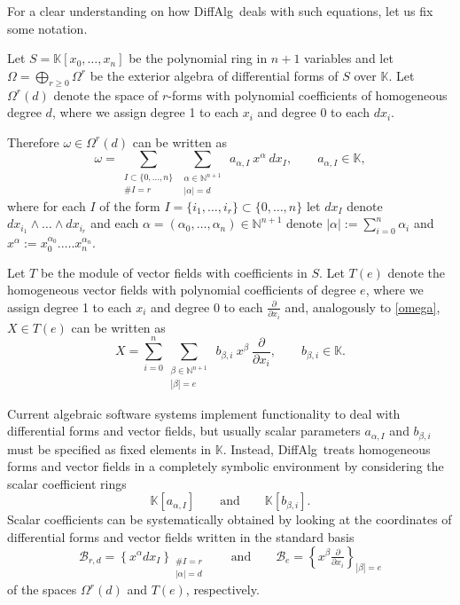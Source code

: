 \documentclass{amsart}
\theoremstyle{definition}
\def\KK{\mathbb{K}}
\def\NN{\mathbb{N}}
\def\dA{{\ttfamily DiffAlg}}
\begin{document}
\bigskip

For a clear understanding on how \dA\ deals with such equations, let us fix some notation.

\bigskip

Let $S=\KK[x_0,\ldots,x_n]$ be the polynomial ring in $n+1$ variables and let $\Omega=\bigoplus_{r\geq 0} \Omega^r$ be the exterior algebra of differential forms of $S$ over $\KK$. Let $\Omega^r(d)$ denote the space of $r$-forms with polynomial coefficients of homogeneous degree $d$, where we assign degree 1 to each $x_i$ and degree 0 to each $dx_i$.

Therefore $\omega\in\Omega^r(d)$ can be written as
\begin{equation}\label{omega}
\omega = \sum_{\substack{I\subset \{0,\ldots,n\} \\ \#I=r}} \sum_{\substack{\alpha\in\NN^{n+1}\\ |\alpha|=d}} \ a_{\alpha,I}\ x^\alpha \ dx_I,\qquad a_{\alpha,I}\in\KK,
\end{equation}
where for each $I$ of the form $I=\{i_1,\ldots,i_r\}\subset \{0,\ldots,n\}$ let $dx_I$ denote $dx_{i_1}\wedge\ldots\wedge dx_{i_r}$ and each $\alpha=(\alpha_0,\ldots,\alpha_n)\in\NN^{n+1}$ denote $|\alpha|:=\sum_{i=0}^n\alpha_i$ and $x^\alpha:=x_0^{\alpha_0}.\ldots.x_n^{\alpha_n}$.

\bigskip

Let $T$ be the module of vector fields with coefficients in $S$. Let $T(e)$ denote the homogeneous vector fields with polynomial coefficients of degree $e$, where we assign degree 1 to each $x_i$ and degree 0 to each $\frac{\partial}{\partial x_i}$ and, analogously to \cref{omega}, $X\in T(e)$ can be written as
\[
X = \sum_{i=0}^n \sum_{\substack{\beta\in\NN^{n+1}\\ |\beta|=e}} \ b_{\beta,i}\ x^\beta \ \frac{\partial}{\partial x_i},\qquad b_{\beta,i}\in\KK.
\]

\bigskip

Current algebraic software systems implement functionality to deal with differential forms and vector fields, but usually scalar parameters $a_{\alpha,I}$ and $b_{\beta,i}$ must be specified as fixed elements in $\KK$.
Instead, \dA\ treats homogeneous forms and vector fields in a completely symbolic environment by considering the scalar coefficient rings
\[
\KK[a_{\alpha,I}]\qquad \text{and}\qquad \KK[b_{\beta,i}].
\]
Scalar coefficients can be systematically obtained by looking at the coordinates of differential forms and vector fields written in the standard basis
\[
\mathcal{B}_{r,d} = \left\{x^\alpha dx_I\right\}_{\substack{\#I=r\\|\alpha|=d}}\qquad\text{and}\qquad \mathcal{B}_{e} = \left\{ x^\beta\tfrac{\partial}{\partial x_i}\right\}_{|\beta|=e}
\]
of the spaces $\Omega^r(d)$ and $T(e)$, respectively.
\end{document}
